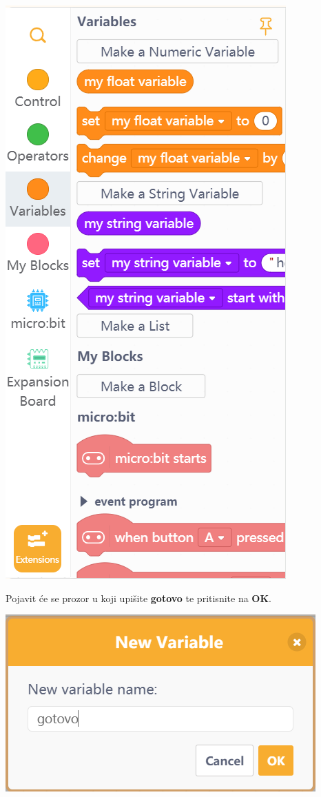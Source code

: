 \includegraphics[scale=0.75]{Rjesenje1.png}

\vspace{3mm}

Pojavit će se prozor u koji upišite \textbf{gotovo} te pritisnite na \textbf{OK}.

\vspace{3mm}

\includegraphics[scale=0.75]{Rjesenje2.png}

